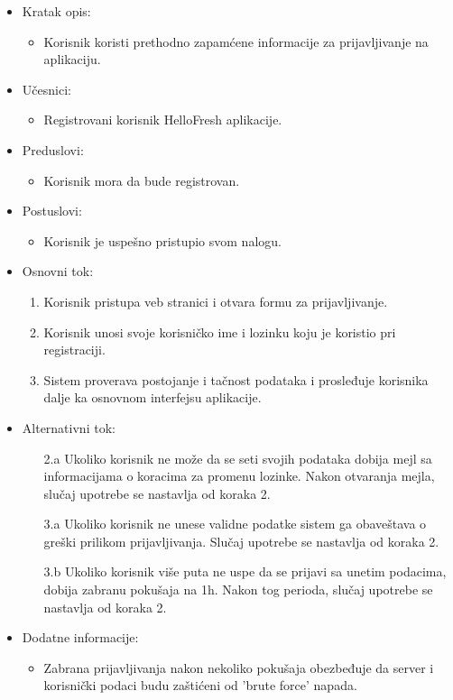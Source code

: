 
\begin{itemize}
    \item Kratak opis:
        \begin{itemize}
            \item Korisnik koristi prethodno zapamćene informacije za prijavljivanje na aplikaciju.
        \end{itemize}
    \item Učesnici:
        \begin{itemize}
            \item Registrovani korisnik HelloFresh aplikacije.
        \end{itemize}
    \item Preduslovi:
        \begin{itemize}
            \item Korisnik mora da bude registrovan.
        \end{itemize}
    \item Postuslovi:
        \begin{itemize}
            \item Korisnik je uspešno pristupio svom nalogu.
        \end{itemize}
    \item Osnovni tok:
        \begin{enumerate}
            \item Korisnik pristupa veb stranici i otvara formu za prijavljivanje.
            \item Korisnik unosi svoje korisničko ime i lozinku koju je koristio pri registraciji.
            \item Sistem proverava postojanje i tačnost podataka i prosleđuje korisnika dalje ka osnovnom interfejsu aplikacije.
        \end{enumerate}
    \item Alternativni tok:
        \begin{itemize}
            \item[2.a] Ukoliko korisnik ne može da se seti svojih podataka dobija mejl sa informacijama o koracima za promenu lozinke. Nakon otvaranja mejla, slučaj upotrebe se nastavlja od koraka 2.
			\item[3.a] Ukoliko korisnik ne unese validne podatke sistem ga obaveštava o greški prilikom prijavljivanja. Slučaj upotrebe se nastavlja od koraka 2.
            \item[3.b] Ukoliko korisnik više puta ne uspe da se prijavi sa unetim podacima, dobija zabranu pokušaja na 1h. Nakon tog perioda, slučaj upotrebe se nastavlja od koraka 2.
        \end{itemize}
    \item Dodatne informacije:
        \begin{itemize}
            \item Zabrana prijavljivanja nakon nekoliko pokušaja obezbeđuje da server i korisnički podaci budu zaštićeni od 'brute force' napada.
        \end{itemize}
\end{itemize}

